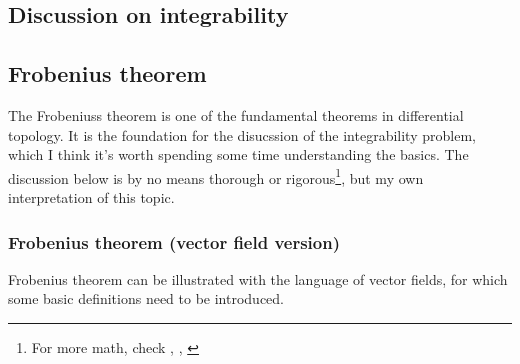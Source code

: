 \subsection{Discussion on integrability}\label{sssec:integrability}

\subsection{Frobenius theorem}\label{sssec:frobenius_theorem}
The Frobeniuss theorem is one of the fundamental theorems in differential topology. It is the foundation for the disucssion of the integrability problem, which I think it's worth spending some time understanding the basics. The discussion below is by no means thorough or rigorous\footnote{For more math, check \cite{sternberg1999lectures}, \cite{warner1983foundations}, \cite{mccleary2013geometry}}, but my own interpretation of this topic.

\subsubsection*{Frobenius theorem (vector field version)}
Frobenius theorem can be illustrated with the language of vector fields, for which some basic definitions need to be introduced.

